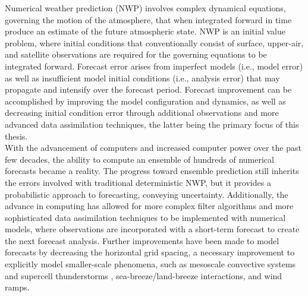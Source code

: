 \documentclass{ttuthes2007}
\newcommand{\tab}{\hspace*{2em}}  %
\begin{document}
\tab Numerical weather prediction (NWP) involves complex dynamical equations, governing the motion of the atmosphere, that when integrated forward in time produce an estimate of the future atmospheric state. NWP is an initial value problem, where initial conditions that conventionally consist of surface, upper-air, and satellite observations are required for the governing equations to be integrated forward. Forecast error arises from imperfect models (i.e., model error) as well as insufficient model initial conditions (i.e., analysis error) that may propagate and intensify over the forecast period. Forecast improvement can be accomplished by improving the model configuration and dynamics, as well as decreasing initial condition error through additional observations and more advanced data assimilation techniques, the latter being the primary focus of this thesis. \\

\tab With the advancement of computers and increased computer power over the past few decades, the ability to compute an ensemble of hundreds of numerical forecasts became a reality. The progress toward ensemble prediction still inherits the errors involved with traditional deterministic NWP, but it provides a probabilistic approach to forecasting, conveying uncertainty. Additionally, the advance in computing has allowed for more complex filter algorithms and more sophisticated data assimilation techniques to be implemented with numerical models, where observations are incorporated with a short-term forecast to create the next forecast analysis. Further improvements have been made to model forecasts by decreasing the horizontal grid spacing, a necessary improvement to explicitly model smaller-scale phenomena, such as mesoscale convective systems and supercell thunderstorms \citep{Kainetal2013}, sea-breeze/land-breeze interactions, and wind ramps.  \\
\end{document}
